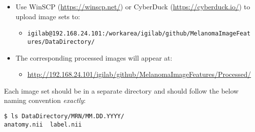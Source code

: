 \documentclass[10pt]{amsart}
\author{
        D.~Fuentes\textsuperscript{1} \
}
\date{ \small
The University of Texas M.D. Anderson Cancer Center,\\
Departments of \textsuperscript{1}Imaging Physics, \textsuperscript{2}Diagnostic Radiology,
\textsuperscript{3}Gastrointenstinal Oncology,
and \textsuperscript{4}Biostatistics, Houston TX 77030, USA \\
Received: date / Accepted: date
}
\begin{document}
\begin{itemize}
\item
Use WinSCP (\href{https://winscp.net/}{https://winscp.net/})
or CyberDuck (\href{https://cyberduck.io/}{https://cyberduck.io/})
to upload image sets to:
\begin{itemize}
\item
\texttt{igilab@192.168.24.101:/workarea/igilab/github/MelanomaImageFeatures/DataDirectory/}
\end{itemize}

\item
The corresponding processed images will appear at:
\begin{itemize}
\item
\href{http://192.168.24.101/igilab/github/MelanomaImageFeatures/Processed/}{http://192.168.24.101/igilab/github/MelanomaImageFeatures/Processed/}
\end{itemize}
\end{itemize}


Each image set should be in a separate directory and should follow
the below naming convention \textit{exactly}:
\begin{verbatim}
$ ls DataDirectory/MRN/MM.DD.YYYY/
anatomy.nii  label.nii
\end{verbatim}

\vspace{4in}
\pagebreak

\setlength{\unitlength}{.15cm}

\end{document}
